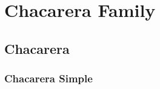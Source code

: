 \begin{cuadrodebaile}[scale=1./5]
	\primeracolocacionb[draw]
	\giros
\end{cuadrodebaile}
\begin{cuadrodebaile}[scale=1./5]
	\primeracolocacionb[draw]
	\giros
\end{cuadrodebaile}
\begin{cuadrodebaile}[scale=1./5]
	\primeracolocacionb[draw]
	\giros
\end{cuadrodebaile}
\begin{cuadrodebaile}[scale=1./5]
	\primeracolocacionb[draw]
	\giros
\end{cuadrodebaile}
\begin{cuadrodebaile}[scale=1./5]
	\primeracolocacionb[draw]
	\giros
\end{cuadrodebaile}

\chapter{Chacarera Family}
\label{chap:chacarera}

\section{Chacarera}
\label{sec:chacarera}

\subsection{Chacarera Simple}
\label{sec:chacarera:simple}


